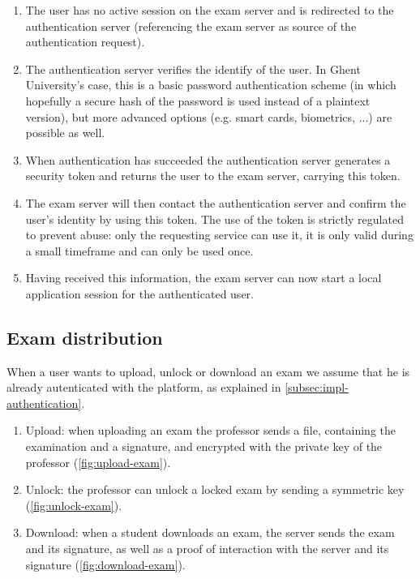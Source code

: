 \documentclass{article}
\begin{document}
\begin{enumerate}
\item The user has no active session on the exam server and is redirected
  to the authentication server (referencing the exam server as source of the
  authentication request).
\item The authentication server verifies the identify of the user. In Ghent
  University's case, this is a basic password authentication scheme (in which
  hopefully a secure hash of the password is used instead of a plaintext
  version), but more advanced options (e.g. smart cards, biometrics, ...) are
  possible as well.
\item When authentication has succeeded the authentication server generates
  a security token and returns the user to the exam server, carrying this token.
\item The exam server will then contact the authentication server and confirm
  the user's identity by using this token. The use of the token is strictly
  regulated to prevent abuse: only the requesting service can use it, it is only
  valid during a small timeframe and can only be used once.
\item Having received this information, the exam server can now start a local
  application session for the authenticated user.
\end{enumerate}

\subsection{Exam distribution}
\label{subsec:impl-exams}

When a user wants to upload, unlock or download an exam we assume that he is
already autenticated with the platform, as explained in
\autoref{subsec:impl-authentication}.

\begin{enumerate}
\item Upload: when uploading an exam the professor sends a file, containing
  the examination and a signature, and encrypted with the private key of the
  professor (\autoref{fig:upload-exam}).
\item Unlock: the professor can unlock a locked exam by sending a symmetric key
  (\autoref{fig:unlock-exam}).
\item Download: when a student downloads an exam, the server sends the
  exam and its signature, as well as a proof of interaction with the server
  and its signature (\autoref{fig:download-exam}).
\end{enumerate}
\end{document}
